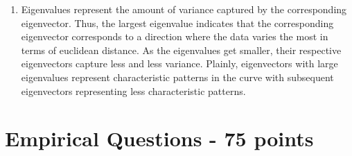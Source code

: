 \documentclass{article}
\begin{document}
\begin{enumerate}
\begin{multicols}{4}
\begin{enumerate}[label=\roman*.]
                  \item CAN 3.50 Mar 28
                  \item CAN 3.25 Sept 28
                  \item CAN 4.00 Mar 29
                  \item CAN 3.50 Sept 29
                  \item CAN 2.75 Mar 30
              \end{enumerate}
          \end{multicols}
    \item Eigenvalues represent the amount of variance captured by the corresponding eigenvector. Thus, the largest eigenvalue indicates that the corresponding eigenvector corresponds to a direction where the data varies the most in terms of euclidean distance. As the eigenvalues get smaller, their respective eigenvectors capture less and less variance. Plainly, eigenvectors with large eigenvalues represent characteristic patterns in the curve with subsequent eigenvectors representing less characteristic patterns.
\end{enumerate}

\section*{Empirical Questions - 75 points}
\end{document}
